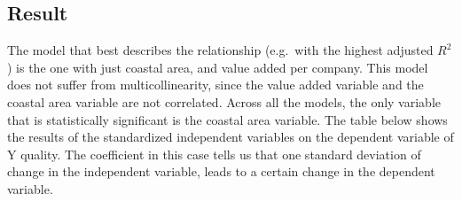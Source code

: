 \documentclass[
]{article}
\begin{document}
\hypertarget{Result}{%
\subsection{Result}\label{Result}}

The model that best describes the relationship (e.g.~with the highest
adjusted \(R^2\)) is the one with just coastal area, and value added per
company. This model does not suffer from multicollinearity, since the
value added variable and the coastal area variable are not correlated.
Across all the models, the only variable that is statistically
significant is the coastal area variable. The table below shows the
results of the standardized independent variables on the dependent
variable of Y quality. The coefficient in this case tells us that one
standard deviation of change in the independent variable, leads to a
certain change in the dependent variable.
\end{document}
